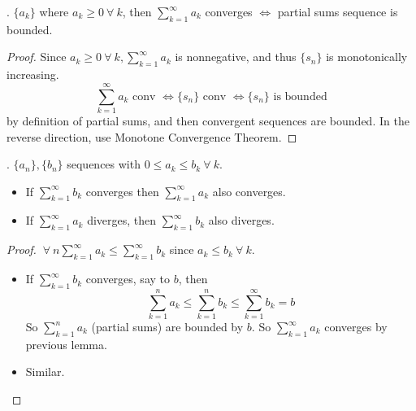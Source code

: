 \documentclass[12pt]{scrartcl}
\begin{document}
\begin{lemma}
  . $\{a_k\}$ where $a_k \geq 0 \ \forall \ k$, then $\sum_{k=1}^\infty a_k$ converges $\Longleftrightarrow$ partial sums sequence is bounded.
  \begin{proof}
    Since $a_k \geq 0 \ \forall \ k, \sum_{k=1}^\infty a_k$ is nonnegative, and thus $\{s_n\}$ is monotonically increasing. 
    \[\sum_{k=1}^\infty a_k \text{ conv } \Longleftrightarrow \{s_n\} \text{ conv } \Longleftrightarrow \{s_n\} \text{ is bounded}\]
    by definition of partial sums, and then convergent sequences are bounded. In the reverse direction, use 
    Monotone Convergence Theorem.
  \end{proof}
\end{lemma}

\begin{theorem}
  . $\{a_n\}, \{b_n\}$ sequences with $0 \leq a_k \leq b_k \ \forall \ k$.  \begin{itemize}
    \item If $\sum_{k=1}^\infty b_k$ converges then $\sum_{k=1}^\infty a_k$ also converges. 
    \item If $\sum_{k=1}^\infty a_k$ diverges, then $\sum_{k=1}^\infty b_k$ also diverges.
  \end{itemize}
  \begin{proof}
    $\ \forall \ n \sum_{k=1}^\infty a_k \leq \sum_{k=1}^\infty b_k$ since $a_k \leq b_k \ \forall \ k$. 
    \begin{itemize}
      \item If $\sum_{k=1}^\infty b_k$ converges, say to $b$, then 
      \[\sum_{k=1}^n a_k \leq \sum_{k=1}^n b_k \leq \sum_{k=1}^\infty b_k = b\]
      So $\sum_{k=1}^n a_k$ (partial sums) are bounded by $b$. So $\sum_{k=1}^\infty a_k$ converges by 
      previous lemma. 
      \item Similar.
    \end{itemize}
  \end{proof}
\end{theorem}
\end{document}
